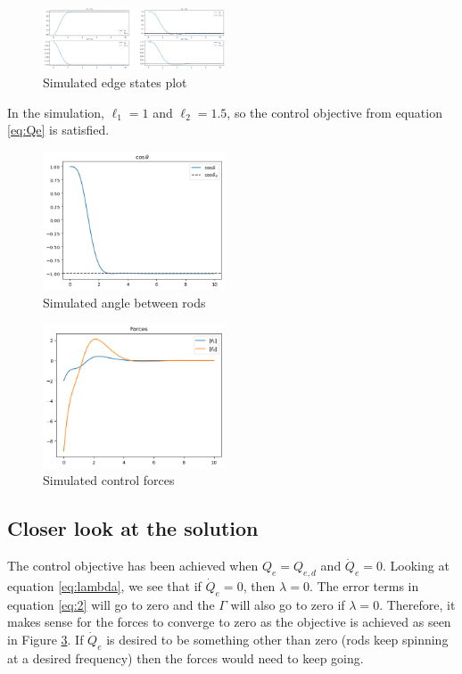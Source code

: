 \documentclass[conference]{IEEEtran}
\begin{document}
\begin{figure}[htbp]
    \centering
    \includegraphics[width=0.48\textwidth]{fig2.png}
    \caption{Simulated edge states plot}
    \label{plots}
\end{figure}
In the simulation, $\ell_1=1$ and $\ell_2=1.5$, so the control objective from equation \ref{eq:Qe} is satisfied.
\begin{figure}[htbp]
    \centering
    \includegraphics[width=0.48\textwidth]{cos.png}
    \caption{Simulated angle between rods}
    \label{plots1}
\end{figure}
\begin{figure}[htbp]
    \centering
    \includegraphics[width=0.48\textwidth]{forces.png}
    \caption{Simulated control forces}
    \label{plots2}
\end{figure}

\subsection{Closer look at the solution}
The control objective has been achieved when $Q_e=Q_{e,d}$ and $\dot{Q}_e=0$. Looking at equation \ref{eq:lambda}, we see that if $\dot{Q}_e=0$, then $\lambda=0$. The error terms in equation \ref{eq:2} will go to zero and the $\Gamma$ will also go to zero if $\lambda=0$. Therefore, it makes sense for the forces to converge to zero as the objective is achieved as seen in Figure \ref{plots2}. If $\dot{Q}_e$ is desired to be something other than zero (rods keep spinning at a desired frequency) then the forces would need to keep going.
\end{document}
